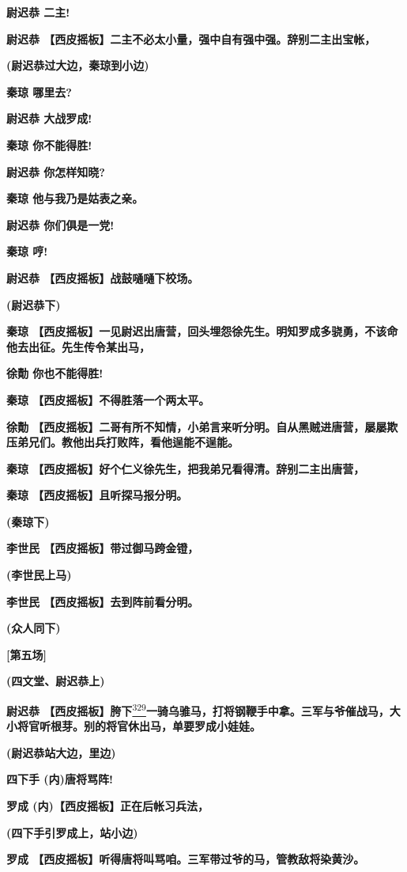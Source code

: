 \textbf{尉迟恭 二主!}

\textbf{尉迟恭
【西皮摇板】二主不必太小量，强中自有强中强。辞别二主出宝帐，}

\textbf{(尉迟恭过大边，秦琼到小边)}

\textbf{秦琼 哪里去?}

\textbf{尉迟恭 大战罗成!}

\textbf{秦琼 你不能得胜!}

\textbf{尉迟恭 你怎样知晓?}

\textbf{秦琼 他与我乃是姑表之亲。}

\textbf{尉迟恭 你们俱是一党!}

\textbf{秦琼 哼!}

\textbf{尉迟恭 【西皮摇板】战鼓嗵嗵下校场。}

\textbf{(尉迟恭下)}

\textbf{秦琼
【西皮摇板】一见尉迟出唐营，回头埋怨徐先生。明知罗成多骁勇，不该命他去出征。先生传令某出马，}

\textbf{徐勣 你也不能得胜!}

\textbf{秦琼 【西皮摇板】不得胜落一个两太平。}

\textbf{徐勣
【西皮摇板】二哥有所不知情，小弟言来听分明。自从黑贼进唐营，屡屡欺压弟兄们。教他出兵打败阵，看他逞能不逞能。}

\textbf{秦琼
【西皮摇板】好个仁义徐先生，把我弟兄看得清。辞别二主出唐营，}

\textbf{秦琼 【西皮摇板】且听探马报分明。}

\textbf{(秦琼下)}

\textbf{李世民 【西皮摇板】带过御马跨金镫，}

\textbf{(李世民上马)}

\textbf{李世民 【西皮摇板】去到阵前看分明。}

\textbf{(众人同下)}

\textbf{{[}第五场{]}}

\textbf{(四文堂、尉迟恭上)}

\textbf{尉迟恭
【西皮摇板】胯下}\protect\hyperlink{fn329}{\textsuperscript{329}}\textbf{一骑乌骓马，打将钢鞭手中拿。三军与爷催战马，大小将官听根芽。别的将官休出马，单要罗成小娃娃。}

\textbf{(尉迟恭站大边，里边)}

\textbf{四下手 (内)唐将骂阵!}

\textbf{罗成 (内)【西皮摇板】正在后帐习兵法，}

\textbf{(四下手引罗成上，站小边)}

\textbf{罗成
【西皮摇板】听得唐将叫骂咱。三军带过爷的马，管教敌将染黄沙。　}

